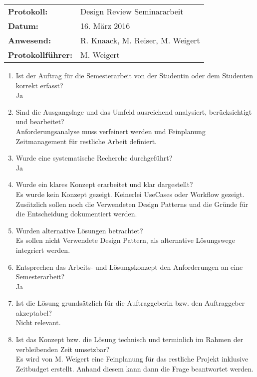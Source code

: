 \begin{tabular}{ll}
	\textbf{Protokoll:} & Design Review Seminararbeit \\
	\textbf{Datum:} & 16. März 2016 \\
	\textbf{Anwesend:} & R. Knaack, M. Reiser, M. Weigert \\
	\textbf{Protokollführer:} & M. Weigert \\
\end{tabular}

\begin{enumerate}
	\item Ist der Auftrag für die Semesterarbeit von der Studentin oder dem Studenten korrekt erfasst? \\
	{\color{DarkSlateBlue}Ja}
	\item Sind die Ausgangslage und das Umfeld ausreichend analysiert, berücksichtigt und bearbeitet? \\
	{\color{DarkSlateBlue}Anforderungsanalyse muss verfeinert werden und Feinplanung Zeitmanagement für restliche Arbeit definiert.}
	\item Wurde eine systematische Recherche durchgeführt?\\
	{\color{DarkSlateBlue}Ja}
	\item Wurde ein klares Konzept erarbeitet und klar dargestellt?\\
	{\color{DarkSlateBlue}Es wurde kein Konzept gezeigt. Keinerlei UseCases oder Workflow gezeigt. Zusätzlich sollen noch die Verwendeten Design Patterns und die Gründe für die Entscheidung dokumentiert werden.}
	\item Wurden alternative Lösungen betrachtet? \\
	{\color{DarkSlateBlue}Es sollen nicht Verwendete Design Pattern, als alternative Lösungswege integriert werden.}
	\item Entsprechen das Arbeits- und Lösungskonzept den Anforderungen an eine Semesterarbeit? \\
	{\color{DarkSlateBlue}Ja}
	\item Ist die Lösung grundsätzlich für die Auftraggeberin bzw. den Auftraggeber akzeptabel? \\
	{\color{DarkSlateBlue}Nicht relevant.}
	\item Ist das Konzept bzw. die Lösung technisch und terminlich im Rahmen der verbleibenden Zeit umsetzbar? \\
	{\color{DarkSlateBlue}Es wird von M. Weigert eine Feinplanung für das restliche Projekt inklusive Zeitbudget erstellt. Anhand diesem kann dann die Frage beantwortet werden.}

\end{enumerate}
